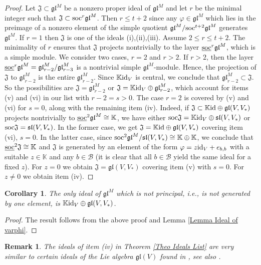 \documentclass[12pt]{article}
\def\KK {{\mathbb K}}     %
\def\B  {\mathcal B}
\def\mk {\mathfrak}
\def\ul  {\underline}
\newtheorem{coro}[theorem]{Corollary}
\newtheorem{rem}{Remark}[section]
\begin{document}
\begin{proof}
Let $\mk J\subset\mk{gl}^M$ be a nonzero proper ideal of $\mk{gl}^M$ and let $r$ be the minimal integer such that $\mk J\subset{\rm soc}^{r}\mk{gl}^M$. Then $r\leq t+2$ since any $\varphi\in\mk{gl}^M$ which lies in the preimage of a nonzero element of the simple quotient $\mk{gl}^M/{\rm soc}^{t+2}\mk{gl}^M$ generates $\mk{gl}^M$. If $r=1$ then $\mk J$ is one of the ideals (i),(ii),(iii). Assume $2\leq r\leq t+2$. The minimality of $r$ ensures that $\mk J$ projects nontrivially to the layer $\ul{\rm soc}^{r}\mk{gl}^M$, which is a simple module. We consider two cases, $r=2$ and $r>2$. If $r>2$, then the layer $\ul{\rm soc}^{r}\mk{gl}^M=\mk{gl}^M_{r-2}/\mk{gl}^M_{r-3}$ is a nontrivial simple $\mk{gl}^M$-module. Hence, the projection of $\mk J$ to $\mk{gl}^M_{r-2}$ is the entire $\mk{gl}^M_{r-2}$. Since $\KK{\rm id}_V$ is central, we conclude that $\mk{gl}^M_{r-2}\subset\mk J$. So the possibilities are $\mk J=\mk{gl}^M_{r-2}$ or $\mk J=\KK{\rm id}_V\oplus\mk{gl}^M_{r-2}$, which account for items (v) and (vi) in our list with $r-2=s>0$. The case $r=2$ is covered by (v) and (vi) for $s=0$, along with the remaining item (iv). Indeed, if $\mk J\subset \KK{\rm id}\oplus\mk{gl}(V,V_*)$ projects nontrivially to $\ul{\rm soc}^2\mk{gl}^M\cong \KK$, we have either ${\rm soc}\mk J=\KK{\rm id}_V\oplus\mk{sl}(V,V_*)$ or ${\rm soc}\mk J=\mk{sl}(V,V_*)$. In the former case, we get $\mk J= \KK{\rm id}\oplus\mk{gl}(V,V_*)$ covering item (vi), $s=0$. In the latter case, since ${\rm soc}^2\mk{gl}^M/\mk{sl}(V,V_*)\cong\KK\oplus\KK$, we conclude that $\ul{\rm soc}^2\mk J\cong \KK$ and $\mk J$ is generated by an element of the form $\varphi=z{\rm id}_V+e_{b,b}$ with a suitable $z\in\KK$ and any $b\in\B$ (it is clear that all $b\in\B$ yield the same ideal for a fixed $z$). For $z=0$ we obtain $\mk J=\mk{gl}(V,V_*)$ covering item (v) with $s=0$. For $z\ne0$ we obtain item (iv). 
\end{proof}

\begin{coro}
The only ideal of $\mk{gl}^M$ which is not principal, i.e., is not generated by one element, is $\KK{\rm id}_V\oplus\mk{gl}(V,V_*)$.
\end{coro}

\begin{proof}
The result follows from the above proof and Lemma \ref{Lemma Ideal of varphi}.
\end{proof}

\begin{rem}
The ideals of item {\rm (iv)} in Theorem \ref{Theo Ideals List} are very similar to certain ideals of the Lie algebra $\mk{gl}(V)$ found in \cite{Stewart}, see also \cite{Polish}.
\end{rem}
\end{document}

